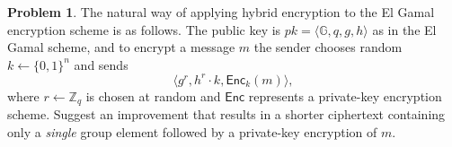 \documentclass[11pt]{article}
\theoremstyle{definition}
\newtheorem{problem}{Problem}
\begin{document}






\begin{problem}
The natural way of applying hybrid encryption to the El Gamal encryption scheme is as follows. The public key is $pk = \langle \mathbb{G},q,g,h\rangle $ as in the El Gamal scheme, and to encrypt a message $m$ the sender chooses random $k \gets \{0,1\}^n$ and sends
\[ \langle g^r, h^r\cdot k, \mathsf{Enc}_k(m)\rangle, \]
where $r\gets \mathbb{Z}_q$ is chosen at random and $\mathsf{Enc}$ represents a private-key encryption scheme. Suggest an improvement that results in a shorter ciphertext containing only a \emph{single} group element followed by a private-key encryption of $m$.
\end{problem}

\end{document}
